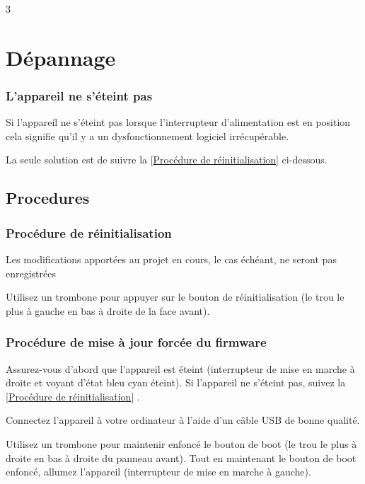 \documentclass[8pt]{extarticle}
\newcommand{\reflabel}[2]{
[\hyperref[#1]{#2}]
}
\begin{document}
\begin{multicols*}{3}
\section{Dépannage}

\subsubsection{L’appareil ne s'éteint pas}

Si l'appareil ne s'éteint pas lorsque l'interrupteur d'alimentation est en position  cela signifie qu'il y a un dysfonctionnement logiciel irrécupérable.

La seule solution est de suivre la \reflabel{procedures:reset}{Procédure de réinitialisation} ci-dessous.

\subsection{Procedures}

\subsubsection{Procédure de réinitialisation}
\label{procedures:reset}

\begin{important}
Les modifications apportées au projet en cours, le cas échéant, ne seront pas enregistrées
\end{important}

Utilisez un trombone pour appuyer sur le bouton de réinitialisation (le trou le plus à gauche en bas à droite de la face avant).

\subsubsection{Procédure de mise à jour forcée du firmware}
\label{procedures:forced_firmware_update}

Assurez-vous d'abord que l'appareil est éteint (interrupteur de mise en marche à droite et voyant d'état bleu cyan éteint). Si l'appareil ne s'éteint pas, suivez la \reflabel{procedures:reset}{Procédure de réinitialisation}.

Connectez l'appareil à votre ordinateur à l'aide d'un câble USB de bonne qualité.

Utilisez un trombone pour maintenir enfoncé le bouton de boot (le trou le plus à droite en bas à droite du panneau avant). Tout en maintenant le bouton de boot enfoncé, allumez l'appareil (interrupteur de mise en marche à gauche).


\end{multicols*}
\end{document}
